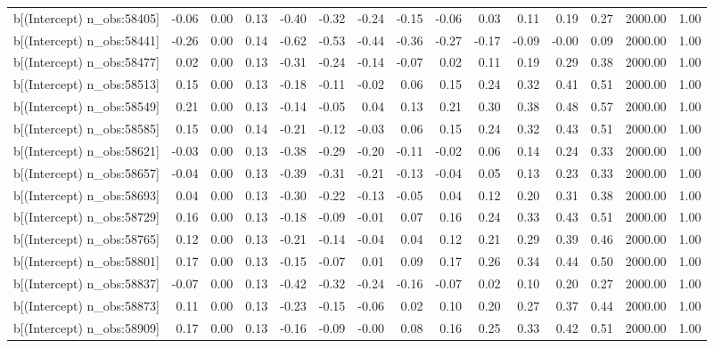 \begin{table}[ht]
\begin{tabular}{rrrrrrrrrrrrrrr}
  b[(Intercept) n\_obs:58405] & -0.06 & 0.00 & 0.13 & -0.40 & -0.32 & -0.24 & -0.15 & -0.06 & 0.03 & 0.11 & 0.19 & 0.27 & 2000.00 & 1.00 \\ 
  b[(Intercept) n\_obs:58441] & -0.26 & 0.00 & 0.14 & -0.62 & -0.53 & -0.44 & -0.36 & -0.27 & -0.17 & -0.09 & -0.00 & 0.09 & 2000.00 & 1.00 \\ 
  b[(Intercept) n\_obs:58477] & 0.02 & 0.00 & 0.13 & -0.31 & -0.24 & -0.14 & -0.07 & 0.02 & 0.11 & 0.19 & 0.29 & 0.38 & 2000.00 & 1.00 \\ 
  b[(Intercept) n\_obs:58513] & 0.15 & 0.00 & 0.13 & -0.18 & -0.11 & -0.02 & 0.06 & 0.15 & 0.24 & 0.32 & 0.41 & 0.51 & 2000.00 & 1.00 \\ 
  b[(Intercept) n\_obs:58549] & 0.21 & 0.00 & 0.13 & -0.14 & -0.05 & 0.04 & 0.13 & 0.21 & 0.30 & 0.38 & 0.48 & 0.57 & 2000.00 & 1.00 \\ 
  b[(Intercept) n\_obs:58585] & 0.15 & 0.00 & 0.14 & -0.21 & -0.12 & -0.03 & 0.06 & 0.15 & 0.24 & 0.32 & 0.43 & 0.51 & 2000.00 & 1.00 \\ 
  b[(Intercept) n\_obs:58621] & -0.03 & 0.00 & 0.13 & -0.38 & -0.29 & -0.20 & -0.11 & -0.02 & 0.06 & 0.14 & 0.24 & 0.33 & 2000.00 & 1.00 \\ 
  b[(Intercept) n\_obs:58657] & -0.04 & 0.00 & 0.13 & -0.39 & -0.31 & -0.21 & -0.13 & -0.04 & 0.05 & 0.13 & 0.23 & 0.33 & 2000.00 & 1.00 \\ 
  b[(Intercept) n\_obs:58693] & 0.04 & 0.00 & 0.13 & -0.30 & -0.22 & -0.13 & -0.05 & 0.04 & 0.12 & 0.20 & 0.31 & 0.38 & 2000.00 & 1.00 \\ 
  b[(Intercept) n\_obs:58729] & 0.16 & 0.00 & 0.13 & -0.18 & -0.09 & -0.01 & 0.07 & 0.16 & 0.24 & 0.33 & 0.43 & 0.51 & 2000.00 & 1.00 \\ 
  b[(Intercept) n\_obs:58765] & 0.12 & 0.00 & 0.13 & -0.21 & -0.14 & -0.04 & 0.04 & 0.12 & 0.21 & 0.29 & 0.39 & 0.46 & 2000.00 & 1.00 \\ 
  b[(Intercept) n\_obs:58801] & 0.17 & 0.00 & 0.13 & -0.15 & -0.07 & 0.01 & 0.09 & 0.17 & 0.26 & 0.34 & 0.44 & 0.50 & 2000.00 & 1.00 \\ 
  b[(Intercept) n\_obs:58837] & -0.07 & 0.00 & 0.13 & -0.42 & -0.32 & -0.24 & -0.16 & -0.07 & 0.02 & 0.10 & 0.20 & 0.27 & 2000.00 & 1.00 \\ 
  b[(Intercept) n\_obs:58873] & 0.11 & 0.00 & 0.13 & -0.23 & -0.15 & -0.06 & 0.02 & 0.10 & 0.20 & 0.27 & 0.37 & 0.44 & 2000.00 & 1.00 \\ 
  b[(Intercept) n\_obs:58909] & 0.17 & 0.00 & 0.13 & -0.16 & -0.09 & -0.00 & 0.08 & 0.16 & 0.25 & 0.33 & 0.42 & 0.51 & 2000.00 & 1.00 \\ 

\end{tabular}
\end{table}

